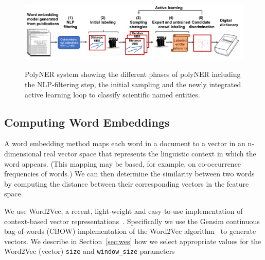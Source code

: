 \begin{figure}[!t]
{\includegraphics[width=\textwidth]{figures/architecture.pdf}}
\caption{\label{fig:architecture} PolyNER system showing the different phases of polyNER including the NLP-filtering step, the initial sampling and the newly integrated active learning loop to classify scientific named entities. 
}
\end{figure}

\subsection{Computing Word Embeddings}\label{sec:we}

A word embedding method 
maps each word
in a document to a vector in an n-dimensional real vector space that
represents the linguistic context in which the word appears. (This mapping may
be based, for example, on co-occurrence frequencies of words.) 
We can then
determine the similarity between two words by computing the distance between
their corresponding vectors in the feature space.

We use Word2Vec, a recent, light-weight and easy-to-use implementation of context-based vector representations~\cite{mikolov2013efficient,mikolov2013distributed}.
Specifically we use the Gensim continuous bag-of-words
(CBOW) implementation of the Word2Vec
algorithm~\cite{rehurek2010software} to generate vectors.
We describe in Section~\ref{sec:wes} how we select appropriate values for the
Word2Vec (vector) \texttt{size} and \texttt{window_size} parameters

